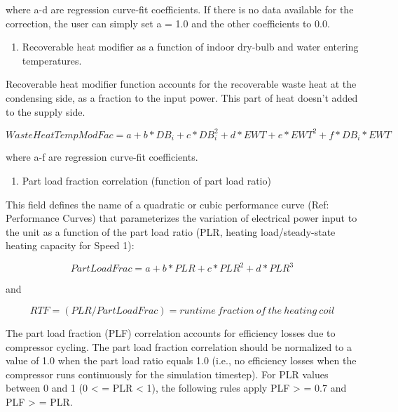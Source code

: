 where a-d are regression curve-fit coefficients.  If there is no data available for the correction, the user can simply set a = 1.0 and the other coefficients to 0.0.

\begin{enumerate}
\def\labelenumi{\arabic{enumi})}
\setcounter{enumi}{6}
\tightlist
\item
  Recoverable heat modifier as a function of indoor dry-bulb and water entering temperatures.
\end{enumerate}

Recoverable heat modifier function accounts for the recoverable waste heat at the condensing side, as a fraction to the input power. This part of heat doesn't added to the supply side.

\begin{equation}
WasteHeatTempModFac = a + b*D{B_i} + c*DB_i^2 + d*EWT + e*EW{T^2} + f*D{B_i}*EWT
\end{equation}

where a-f are regression curve-fit coefficients.

\begin{enumerate}
\def\labelenumi{\arabic{enumi})}
\setcounter{enumi}{7}
\tightlist
\item
  Part load fraction correlation (function of part load ratio)
\end{enumerate}

This field defines the name of a quadratic or cubic performance curve (Ref: Performance Curves) that parameterizes the variation of electrical power input to the unit as a function of the part load ratio (PLR, heating load/steady-state heating capacity for Speed 1):

\begin{equation}
PartLoadFrac = a + b*PLR + c*PL{R^2} + d*PL{R^3}
\end{equation}

and

\begin{equation}
RTF = (PLR/PartLoadFrac) = runtime~fraction~of~the~heating~coil
\end{equation}

The part load fraction (PLF) correlation accounts for efficiency losses due to compressor cycling. The part load fraction correlation should be normalized to a value of 1.0 when the part load ratio equals 1.0 (i.e., no efficiency losses when the compressor runs continuously for the simulation timestep). For PLR values between 0 and 1 (0 \textless{} = PLR \textless{} 1), the following rules apply PLF \textgreater{} = 0.7 and PLF \textgreater{} = PLR.

